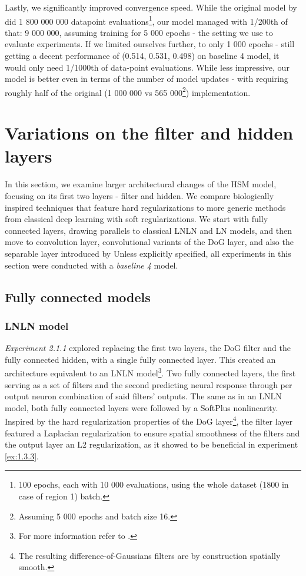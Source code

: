 Lastly, we significantly improved convergence speed. While the original model by \citeauthor{antolik} did 1 800 000 000 datapoint evaluations\footnote{100 epochs, each with 10 000 evaluations, using the whole dataset (1800 in case of region 1) batch.}, our model managed with 1/200th of that: 9 000 000, assuming training for 5 000 epochs - the setting we use to evaluate experiments. If we limited ourselves further, to only 1 000 epochs - still getting a decent performance of (0.514, 0.531, 0.498) on baseline 4 model, it would only need 1/1000th of data-point evaluations. While less impressive, our model is better even in terms of the number of model updates - with requiring roughly half of the original (1 000 000 vs 565 000\footnote{Assuming 5 000 epochs and batch size 16.}) implementation.

\section{Variations on the filter and hidden layers}
In this section, we examine larger architectural changes of the HSM model, focusing on its first two layers - filter and hidden. We compare biologically inspired techniques that feature hard regularizations to more generic methods from classical deep learning with soft regularizations. We start with fully connected layers, drawing parallels to classical LNLN and LN models, and then move to convolution layer, convolutional variants of the DoG layer, and also the separable layer introduced by \cite{klindt} Unless explicitly specified, all experiments in this section were conducted with a \textit{baseline 4} model.

\subsection{Fully connected models}
\subsubsection{LNLN model}\label{ex:2.1.1}

\textit{Experiment 2.1.1} explored replacing the first two layers, the DoG filter and the fully connected hidden, with a single fully connected layer. This created an architecture equivalent to an LNLN model\footnote{For more information refer to .}. Two fully connected layers, the first serving as a set of filters and the second predicting neural response through per output neuron combination of said filters’ outputs. The same as in an LNLN model, both fully connected layers were followed by a SoftPlus nonlinearity. Inspired by the hard regularization properties of the DoG layer\footnote{The resulting difference-of-Gaussians filters are by construction spatially smooth.}, the filter layer featured a Laplacian regularization to ensure spatial smoothness of the filters and the output layer an L2 regularization, as it showed to be beneficial in experiment \ref{ex:1.3.3}.

